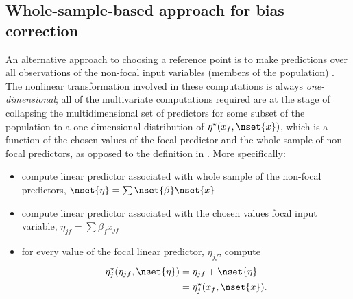 
\subsection{Whole-sample-based approach for bias correction}

An alternative approach to choosing a reference point is to make predictions over all observations of the non-focal input variables (members of the population) \citep{hanmer2013behind}. The nonlinear transformation involved in these computations is always \emph{one-dimensional}; all of the multivariate computations required are at the stage of collapsing the multidimensional set of predictors for some subset of the population to a one-dimensional distribution of $\eta^\star(x_f, \nset{x})$, which is a function of the chosen values of the focal predictor and the whole sample of non-focal predictors, as opposed to the definition in . More specifically:
\begin{itemize}
\item compute linear predictor associated with whole sample of the non-focal predictors, $\nset{\eta} = \sum \nset{\beta} \nset{x}$
\item compute linear predictor associated with the chosen values focal input variable, $\eta_{jf} = \sum{\beta_f x_{jf}}$
\item for every value of the focal linear predictor, $\eta_{jf}$, compute
%
\begin{align}\label{eq:pop_eta} 
\eta_j^\star(\eta_{jf}, \nset{\eta})  &= \eta_{jf} + \nset{\eta} \nonumber \\
&= \eta_j^\star(x_f, \nset{x}).
\end{align}
\end{itemize}
%

